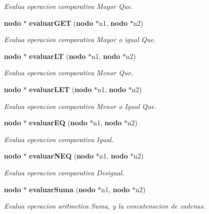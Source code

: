 \begin{CompactItemize}
\begin{CompactList}\small\item\em Evalua operacion comparativa Mayor Que. \item\end{CompactList}\item 
{\bf nodo} $\ast$ {\bf evaluar\-GET} ({\bf nodo} $\ast$n1, {\bf nodo} $\ast$n2)
\begin{CompactList}\small\item\em Evalua operacion comparativa Mayor o igual Que. \item\end{CompactList}\item 
{\bf nodo} $\ast$ {\bf evaluar\-LT} ({\bf nodo} $\ast$n1, {\bf nodo} $\ast$n2)
\begin{CompactList}\small\item\em Evalua operacion comparativa Menor Que. \item\end{CompactList}\item 
{\bf nodo} $\ast$ {\bf evaluar\-LET} ({\bf nodo} $\ast$n1, {\bf nodo} $\ast$n2)
\begin{CompactList}\small\item\em Evalua operacion comparativa Menor o Igual Que. \item\end{CompactList}\item 
{\bf nodo} $\ast$ {\bf evaluar\-EQ} ({\bf nodo} $\ast$n1, {\bf nodo} $\ast$n2)
\begin{CompactList}\small\item\em Evalua operacion comparativa Igual. \item\end{CompactList}\item 
{\bf nodo} $\ast$ {\bf evaluar\-NEQ} ({\bf nodo} $\ast$n1, {\bf nodo} $\ast$n2)
\begin{CompactList}\small\item\em Evalua operacion comparativa Desigual. \item\end{CompactList}\item 
{\bf nodo} $\ast$ {\bf evaluar\-Suma} ({\bf nodo} $\ast$n1, {\bf nodo} $\ast$n2)
\begin{CompactList}\small\item\em Evalua operacion aritmetica Suma, y la concatenacion de cadenas. \item\end{CompactList}\item 

\end{CompactItemize}
